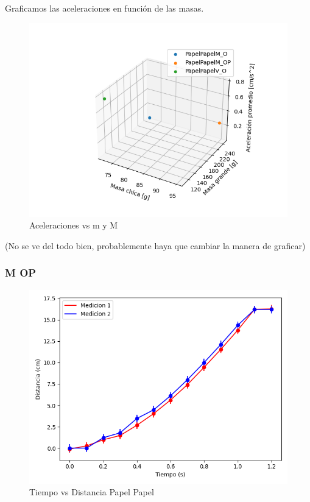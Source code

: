 \documentclass[12pt,a4]{article}
\begin{document}
\newpage
Graficamos las aceleraciones en función de las masas.

\begin{figure}[H]
    \centering
    \includegraphics[width=0.9\linewidth]{scatter_aceleraciones.png}
    \caption{Aceleraciones vs m y M}
    \label{fig:aPPM_O}
\end{figure}

(No se ve del todo bien, probablemente haya que cambiar la manera de graficar) \\

\subsubsection{M OP}

\begin{figure}[H]
    \centering
    \includegraphics[width=0.9\linewidth]{TiempoVsDistanciaPapelPapelM_OP.png}
    \caption{Tiempo vs Distancia Papel Papel}
    \label{fig:TvDM_OP papel papel}
\end{figure}
\end{document}
